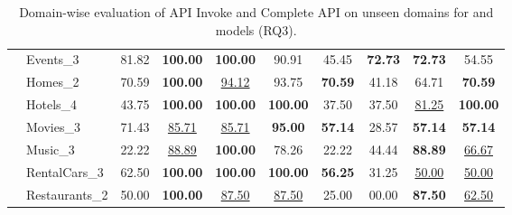 \begin{table*}[!t]
\begin{adjustbox}{max width=\textwidth}
\begin{tabular}{|c|l|c c c c| c c c c|}
 & Events\_3      & 81.82 & \textbf{100.00} & \textbf{100.00} & 90.91 & 45.45 & \textbf{72.73} & \textbf{72.73} & 54.55 \\
 & Homes\_2       & 70.59 & \textbf{100.00} & \underline{94.12} & 93.75 & \textbf{70.59} & 41.18 & 64.71 & \textbf{70.59} \\
 & Hotels\_4      & 43.75 & \textbf{100.00} & \textbf{100.00} & \textbf{100.00} & 37.50 & 37.50 & \underline{81.25} & \textbf{100.00} \\
 & Movies\_3      & 71.43 & \underline{85.71} & \underline{85.71} & \textbf{95.00} & \textbf{57.14} & 28.57 & \textbf{57.14} & \textbf{57.14} \\
 & Music\_3       & 22.22 & \underline{88.89} & \textbf{100.00} & 78.26 & 22.22 & 44.44 & \textbf{88.89} & \underline{66.67} \\
 & RentalCars\_3  & 62.50 & \textbf{100.00} & \textbf{100.00} & \textbf{100.00} & \textbf{56.25} & 31.25 & \underline{50.00} & \underline{50.00} \\
 & Restaurants\_2 & 50.00 & \textbf{100.00} & \underline{87.50} & \underline{87.50} & 25.00 & 00.00 & \textbf{87.50} & \underline{62.50} \\
 \hline
        \end{tabular}
    \end{adjustbox}
    \vspace{-6pt}
    \caption{Domain-wise evaluation of API Invoke and Complete API on unseen domains for {\autotod} and {\oursys} models (RQ3).}
    \label{tab:unseen_domain_results}
    \vspace{-10pt}
\end{table*}


